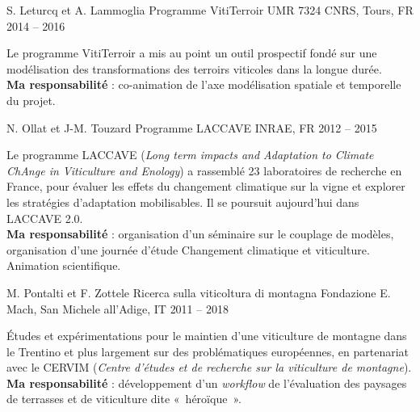 \begin{cventries}

\cventry
{S. Leturcq et A. Lammoglia} %
{Programme VitiTerroir} %
{UMR 7324 CNRS, Tours, FR} %
{2014 -- 2016} %
{
  \begin{cvitems} %
    Le programme VitiTerroir a mis au point un outil prospectif fondé sur une modélisation des transformations des terroirs viticoles dans la longue durée.\\
    \textbf{Ma responsabilité} : co-animation de l'axe modélisation spatiale et temporelle du projet.
  \end{cvitems}
}

\cventry
{N. Ollat et J-M. Touzard} %
{Programme LACCAVE} %
{INRAE, FR} %
{2012 -- 2015} %
{
  \begin{cvitems} %
  Le programme LACCAVE (\emph{Long term impacts and Adaptation to Climate ChAnge in Viticulture and Enology}) a rassemblé 23 laboratoires de recherche en France, pour évaluer les effets du changement climatique sur la vigne et explorer les stratégies d'adaptation mobilisables. Il se poursuit aujourd'hui dans LACCAVE 2.0.\\
  \textbf{Ma responsabilité} : organisation d'un séminaire sur le  couplage de modèles, organisation d'une journée d'étude Changement climatique et viticulture. Animation scientifique.
  \end{cvitems}
}

\cventry
{M. Pontalti et F. Zottele} %
{Ricerca sulla viticoltura di montagna} %
{Fondazione E. Mach, San Michele all'Adige, IT} %
{2011 -- 2018} %
{
  \begin{cvitems} %
    Études et expérimentations pour le maintien d'une viticulture de montagne dans le Trentino et plus largement sur des problématiques européennes, en partenariat avec le CERVIM (\emph{Centre d'études et de recherche sur la viticulture de montagne}).\\
    \textbf{Ma responsabilité} : développement d’un \emph{workflow} de l’évaluation des paysages de terrasses et de viticulture dite « héroïque ».
  \end{cvitems}
}


\end{cventries}
